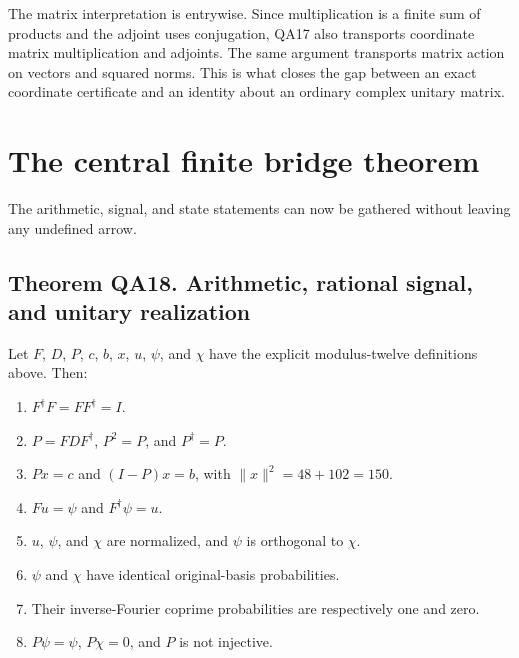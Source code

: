 The matrix interpretation is entrywise. Since multiplication is a finite
sum of products and the adjoint uses conjugation, QA17 also transports
coordinate matrix multiplication and adjoints. The same argument
transports matrix action on vectors and squared norms. This is what
closes the gap between an exact coordinate certificate and an identity
about an ordinary complex unitary matrix.

\hypertarget{q:the-central-finite-bridge-theorem}{%
\section{The central finite bridge
theorem}\label{q:the-central-finite-bridge-theorem}}

The arithmetic, signal, and state statements can now be gathered without
leaving any undefined arrow.

\hypertarget{q:theorem-qa18.-arithmetic-rational-signal-and-unitary-realization}{%
\subsection*{Theorem QA18. Arithmetic, rational signal, and unitary
realization}\label{q:theorem-qa18.-arithmetic-rational-signal-and-unitary-realization}}

Let \(F\), \(D\), \(P\), \(c\), \(b\), \(x\), \(u\), \(\psi\), and
\(\chi\) have the explicit modulus-twelve definitions above. Then:

\begin{enumerate}
\def\labelenumi{\arabic{enumi}.}

\item
  \(F^\dagger F=FF^\dagger=I\).
\item
  \(P=FDF^\dagger\), \(P^2=P\), and \(P^\dagger=P\).
\item
  \(Px=c\) and \((I-P)x=b\), with \(\|x\|^2=48+102=150\).
\item
  \(Fu=\psi\) and \(F^\dagger\psi=u\).
\item
  \(u\), \(\psi\), and \(\chi\) are normalized, and \(\psi\) is
  orthogonal to \(\chi\).
\item
  \(\psi\) and \(\chi\) have identical original-basis probabilities.
\item
  Their inverse-Fourier coprime probabilities are respectively one and
  zero.
\item
  \(P\psi=\psi\), \(P\chi=0\), and \(P\) is not injective.
\end{enumerate}

